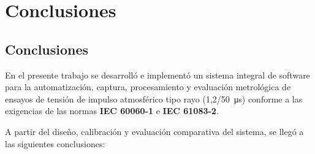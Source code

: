 \newpage
\chapter*{Conclusiones}
\label{ch:conclusiones}
\vspace{3\baselineskip}


\section{Conclusiones}

En el presente trabajo se desarrolló e implementó un sistema integral de software para la automatización, captura, procesamiento y evaluación metrológica de ensayos de tensión de impulso atmosférico tipo rayo (\qty[parse-numbers=false]{1,2/50}{\micro\second}) conforme a las exigencias de las normas \textbf{IEC 60060-1} e \textbf{IEC 61083-2}.

A partir del diseño, calibración y evaluación comparativa del sistema, se llegó a las siguientes conclusiones:

